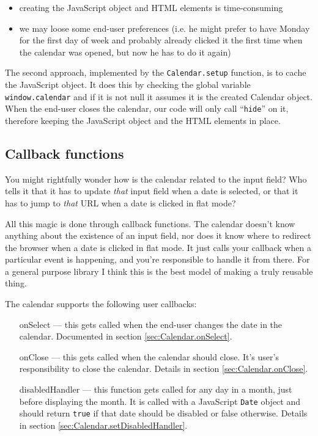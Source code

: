 \documentclass[a4paper,10pt]{article}
\begin{document}
\begin{itemize}

\item creating the JavaScript object and HTML elements is time-consuming

\item we may loose some end-user preferences (i.e. he might prefer to have
Monday for the first day of week and probably already clicked it the first time
when the calendar was opened, but now he has to do it again)

\end{itemize}

The second approach, implemented by the \texttt{Calendar.setup} function, is to
cache the JavaScript object.  It does this by checking the global variable
\texttt{window.calendar} and if it is not null it assumes it is the created
Calendar object.  When the end-user closes the calendar, our code will only
call ``\texttt{hide}'' on it, therefore keeping the JavaScript object and the
HTML elements in place.

\subsection{Callback functions}

You might rightfully wonder how is the calendar related to the input field?
Who tells it that it has to update \emph{that} input field when a date is
selected, or that it has to jump to \emph{that} URL when a date is clicked in
flat mode?

All this magic is done through callback functions.  The calendar doesn't know
anything about the existence of an input field, nor does it know where to
redirect the browser when a date is clicked in flat mode.  It just calls your
callback when a particular event is happening, and you're responsible to handle
it from there.  For a general purpose library I think this is the best model of
making a truly reusable thing.

The calendar supports the following user callbacks:

\begin{itemize}

\item [onSelect] --- this gets called when the end-user changes the date in the
calendar.  Documented in section \ref{sec:Calendar.onSelect}.

\item [onClose] --- this gets called when the calendar should close.  It's
user's responsibility to close the calendar.  Details in section
\ref{sec:Calendar.onClose}.

\item [disabledHandler] --- this function gets called for any day in a month,
just before displaying the month.  It is called with a JavaScript \texttt{Date}
object and should return \texttt{true} if that date should be disabled
or false otherwise.  Details in section \ref{sec:Calendar.setDisabledHandler}.

\end{itemize}
\end{document}
